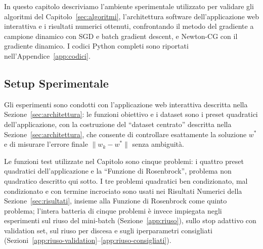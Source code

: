 \documentclass[a4paper,12pt]{article}
\numberwithin{equation}{section}
\numberwithin{figure}{section}
\numberwithin{table}{section}
\begin{document}
In questo capitolo descriviamo l'ambiente sperimentale utilizzato per
validare gli algoritmi del Capitolo~\ref{sec:algoritmi}, l'architettura
software dell'applicazione web interattiva e i risultati numerici ottenuti,
confrontando il metodo del gradiente a campione dinamico con SGD e batch
gradient descent, e Newton-CG con il gradiente dinamico. I codici Python
completi sono riportati nell'Appendice~\ref{app:codici}.

\subsection{Setup Sperimentale}\label{sec:setup}

Gli esperimenti sono condotti con l'applicazione web interattiva descritta
nella Sezione~\ref{sec:architettura}: le funzioni obiettivo e i dataset sono
i preset quadratici dell'applicazione, con la costruzione del ``dataset
centrato'' descritta nella Sezione~\ref{sec:architettura}, che consente di
controllare esattamente la soluzione $w^*$ e di misurare l'errore finale
$\|w_k - w^*\|$ senza ambiguità.

Le funzioni test utilizzate nel Capitolo sono cinque problemi: i quattro
preset quadratici dell'applicazione e la ``Funzione di Rosenbrock'', problema
non quadratico descritto qui sotto. I tre problemi quadratici ben
condizionato, mal condizionato e con termine incrociato sono usati nei
Risultati Numerici della Sezione~\ref{sec:risultati}, insieme alla Funzione di Rosenbrock come
quinto problema; l'intera batteria di cinque problemi è invece impiegata negli
esperimenti sul riuso del mini-batch (Sezione~\ref{app:riuso}), sullo stop
adattivo con validation set, sul riuso per discesa e sugli iperparametri
consigliati (Sezioni~\ref{app:riuso-validation}--\ref{app:riuso-consigliati}).
\end{document}
